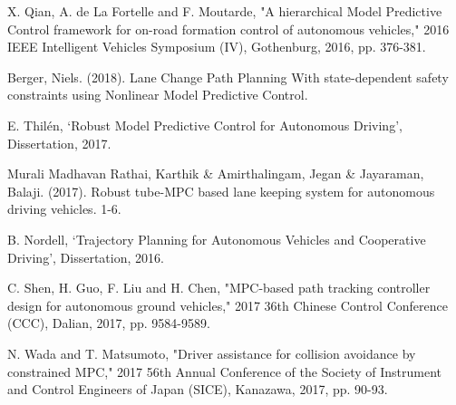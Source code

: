 \documentclass[conference, 11pt]{IEEEtran}
\begin{document}
\begin{thebibliography}{00}
	X. Qian, A. de La Fortelle and F. Moutarde, "A hierarchical Model Predictive Control framework for on-road formation control of autonomous vehicles," 2016 IEEE Intelligent Vehicles Symposium (IV), Gothenburg, 2016, pp. 376-381.
	
	Berger, Niels. (2018). Lane Change Path Planning With state-dependent safety constraints using Nonlinear Model Predictive Control.
	
	E. Thilén, ‘Robust Model Predictive Control for Autonomous Driving’, Dissertation, 2017.
	
	Murali Madhavan Rathai, Karthik \& Amirthalingam, Jegan \& Jayaraman, Balaji. (2017). Robust tube-MPC based lane keeping system for autonomous driving vehicles. 1-6.
	
	
	B. Nordell, ‘Trajectory Planning for Autonomous Vehicles and Cooperative Driving’, Dissertation, 2016.
	
	C. Shen, H. Guo, F. Liu and H. Chen, "MPC-based path tracking controller design for autonomous ground vehicles," 2017 36th Chinese Control Conference (CCC), Dalian, 2017, pp. 9584-9589.
	
	
		N. Wada and T. Matsumoto, "Driver assistance for collision avoidance by constrained MPC," 2017 56th Annual Conference of the Society of Instrument and Control Engineers of Japan (SICE), Kanazawa, 2017, pp. 90-93.
		
\end{thebibliography}
\end{document}
